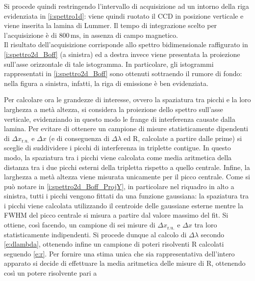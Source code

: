 \documentclass[twocolumn,10pt]{asme2ej}
\begin{document}
Si procede quindi restringendo l'intervallo di acquisizione ad un intorno della riga evidenziata in
\autoref{i:spettro1d}: viene quindi ruotato il CCD in posizione verticale e viene inserita la lamina di Lummer. Il tempo
di integrazione scelto per l'acquisizione è di $800\,\si{\milli\second}$, in assenza di campo magnetico. \\
Il risultato dell'acquisizione corrisponde allo spettro bidimensionale raffigurato in \autoref{i:spettro2d_Boff} (a
sinistra) ed a destra invece viene presentata la proiezione sull'asse orizzontale di tale istogramma. In particolare,
gli istogrammi rappresentati in \autoref{i:spettro2d_Boff} sono ottenuti sottraendo il rumore di fondo: nella figura a
sinistra, infatti, la riga di emissione è ben evidenziata. 



Per calcolare ora le grandezze di interesse, ovvero la spaziatura tra picchi e la loro larghezza a metà altezza, si
considera la proiezione dello spettro sull'asse verticale, evidenziando in questo modo le frange di interferenza causate
dalla lamina. Per evitare di ottenere un campione di misure statisticamente dipendenti di $\Delta x_{\text{r.u.}}$ e
$\Delta x$ (e di conseguenza di $\Delta\lambda$ ed R, calcolate a partire dalle prime) si sceglie di suddividere i
picchi di interferenza in triplette contigue. In questo modo, la spaziatura tra i picchi viene calcolata come media
aritmetica della distanza tra i due picchi esterni della tripletta rispetto a quello centrale. Infine, la larghezza a
metà altezza viene misurata unicamente per il picco centrale. Come si può notare in \autoref{i:spettro2d_Boff_ProjY}, in
particolare nel riquadro in alto a sinistra, tutti i picchi vengono fittati da una funzione gaussiana: la spaziatura tra
i picchi viene calcolata utilizzando il centroide delle gaussiane esterne mentre la FWHM del picco centrale si misura a
partire dal valore massimo del fit. Si ottiene, così facendo, un campione di sei misure di $\Delta x_{\text{r.u.}}$ e
$\Delta x$ tra loro statisticamente indipendenti. Si procede dunque al calcolo di $\Delta\lambda$ secondo
\autoref{e:dlambda}, ottenendo infine un campione di poteri risolventi R calcolati seguendo \autoref{e:r}. Per fornire
una stima unica che sia rappresentativa dell'intero apparato si decide di effettuare la media aritmetica delle misure di
R, ottenendo così un potere risolvente pari a 
\end{document}
